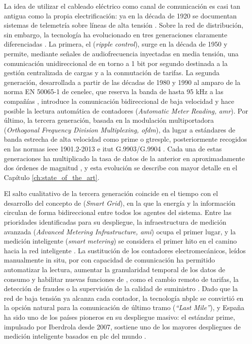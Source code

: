 La idea de utilizar el cableado eléctrico como canal de comunicación es casi tan antigua como la propia electrificación: ya en la década de 1920 se documentan sistemas de telemetría sobre líneas de alta tensión \cite{SHARMA2017704}. Sobre la red de distribución, sin embargo, la tecnología ha evolucionado en tres generaciones claramente diferenciadas \cite{5764444}. La primera, el  (\textit{ripple control}), surge en la década de 1950 y permite, mediante señales de audiofrecuencia inyectadas en media tensión, una comunicación unidireccional de en torno a 1 bit por segundo destinada a la gestión centralizada de cargas y a la conmutación de tarifas. La segunda generación, desarrollada a partir de las décadas de 1980 y 1990 al amparo de la norma EN 50065-1 de \gls{cenelec}, que reserva la banda de hasta 95 kHz a las compañías  \cite{EN50065_1}, introduce la comunicación bidireccional de baja velocidad y hace posible la lectura automática de contadores (\textit{Automatic Meter Reading, \gls{amr}}). Por último, la tercera generación, basada en la modulación multiportadora (\textit{Orthogonal Frequency Division Multiplexing, \gls{ofdm}}), da lugar a estándares de banda estrecha de alta velocidad como \gls{prime} o \gls{gtresplc}, posteriormente recogidos en las normas \gls{ieee} 1901.2-2013 e \gls{itut} G.9903/G.9904 \cite{5764444, SHARMA2017704}. Cada una de estas generaciones ha multiplicado la tasa de datos de la anterior en aproximadamente dos órdenes de magnitud \cite{5764444}, y esta evolución se describe con mayor detalle en el Capítulo \ref{ch:state_of_the_art}.

El salto cualitativo de la tercera generación coincide en el tiempo con el desarrollo del concepto de  (\textit{Smart Grid}), en la que la energía y la información circulan de forma bidireccional entre todos los agentes del sistema. Entre las prioridades identificadas para su despliegue, la infraestructura de medición avanzada (\textit{Advanced Metering Infrastructure, \gls{ami}}) ocupa el primer lugar, y la medición inteligente (\textit{smart metering}) se considera el primer hito en el camino hacia la red inteligente \cite{5764443}. La sustitución de los contadores electromecánicos, leídos manualmente in situ, por  con capacidad de comunicación ha permitido automatizar la lectura, aumentar la granularidad temporal de los datos de consumo y habilitar nuevas funciones de , como el cambio remoto de tarifas, la detección de fraudes o la supervisión de la calidad de suministro \cite{WorldBank_AMI_Survey}. Dado que la red de baja tensión ya alcanza cada contador, la tecnología \gls{nbplc} se convirtió en la opción natural para la comunicación de último tramo (\textit{``Last Mile''}), y España ha sido uno de los países pioneros en su despliegue masivo: el estándar \gls{prime}, impulsado por Iberdrola desde 2007, sostiene uno de los mayores despliegues de medición inteligente basados en \gls{plc} del mundo \cite{SHARMA2017704}.

